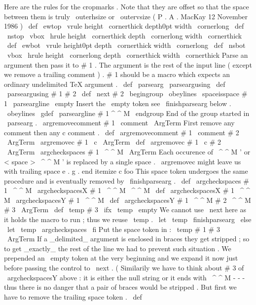 %
Here
are
the
rules
for
the
cropmarks
.
Note
that
they
are
%
offset
so
that
the
space
between
them
is
truly
\
outerhsize
or
\
outervsize
%
(
P
.
A
.
MacKay
12
November
1986
)
%
\
def
\
ewtop
{
\
vrule
height
\
cornerthick
depth0pt
width
\
cornerlong
}
\
def
\
nstop
{
\
vbox
{
\
hrule
height
\
cornerthick
depth
\
cornerlong
width
\
cornerthick
}
}
\
def
\
ewbot
{
\
vrule
height0pt
depth
\
cornerthick
width
\
cornerlong
}
\
def
\
nsbot
{
\
vbox
{
\
hrule
height
\
cornerlong
depth
\
cornerthick
width
\
cornerthick
}
}
%
Parse
an
argument
then
pass
it
to
#
1
.
The
argument
is
the
rest
of
%
the
input
line
(
except
we
remove
a
trailing
comment
)
.
#
1
should
be
a
%
macro
which
expects
an
ordinary
undelimited
TeX
argument
.
%
\
def
\
parsearg
{
\
parseargusing
{
}
}
\
def
\
parseargusing
#
1
#
2
{
%
\
def
\
next
{
#
2
}
%
\
begingroup
\
obeylines
\
spaceisspace
#
1
%
\
parseargline
\
empty
%
Insert
the
\
empty
token
see
\
finishparsearg
below
.
}
{
\
obeylines
%
\
gdef
\
parseargline
#
1
^
^
M
{
%
\
endgroup
%
End
of
the
group
started
in
\
parsearg
.
\
argremovecomment
#
1
\
comment
\
ArgTerm
%
}
%
}
%
First
remove
any
comment
then
any
c
comment
.
\
def
\
argremovecomment
#
1
\
comment
#
2
\
ArgTerm
{
\
argremovec
#
1
\
c
\
ArgTerm
}
\
def
\
argremovec
#
1
\
c
#
2
\
ArgTerm
{
\
argcheckspaces
#
1
\
^
^
M
\
ArgTerm
}
%
Each
occurence
of
\
^
^
M
'
or
<
space
>
\
^
^
M
'
is
replaced
by
a
single
space
.
%
%
\
argremovec
might
leave
us
with
trailing
space
e
.
g
.
%
end
itemize
c
foo
%
This
space
token
undergoes
the
same
procedure
and
is
eventually
removed
%
by
\
finishparsearg
.
%
\
def
\
argcheckspaces
#
1
\
^
^
M
{
\
argcheckspacesX
#
1
\
^
^
M
\
^
^
M
}
\
def
\
argcheckspacesX
#
1
\
^
^
M
{
\
argcheckspacesY
#
1
\
^
^
M
}
\
def
\
argcheckspacesY
#
1
\
^
^
M
#
2
\
^
^
M
#
3
\
ArgTerm
{
%
\
def
\
temp
{
#
3
}
%
\
ifx
\
temp
\
empty
%
We
cannot
use
\
next
here
as
it
holds
the
macro
to
run
;
%
thus
we
reuse
\
temp
.
\
let
\
temp
\
finishparsearg
\
else
\
let
\
temp
\
argcheckspaces
\
fi
%
Put
the
space
token
in
:
\
temp
#
1
#
3
\
ArgTerm
}
%
If
a
_delimited_
argument
is
enclosed
in
braces
they
get
stripped
;
so
%
to
get
_exactly_
the
rest
of
the
line
we
had
to
prevent
such
situation
.
%
We
prepended
an
\
empty
token
at
the
very
beginning
and
we
expand
it
now
%
just
before
passing
the
control
to
\
next
.
%
(
Similarily
we
have
to
think
about
#
3
of
\
argcheckspacesY
above
:
it
is
%
either
the
null
string
or
it
ends
with
\
^
^
M
-
-
-
thus
there
is
no
danger
%
that
a
pair
of
braces
would
be
stripped
.
%
%
But
first
we
have
to
remove
the
trailing
space
token
.
%
\
def
